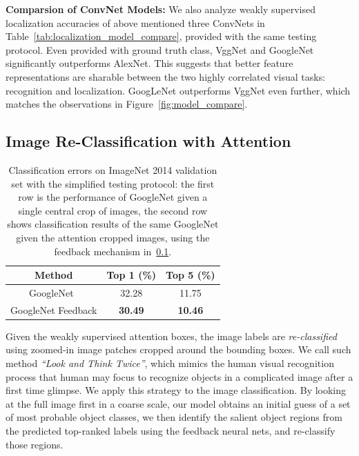 \textbf{Comparsion of ConvNet Models:} We also analyze weakly supervised localization accuracies of above mentioned three ConvNets in Table~\ref{tab:localization_model_compare}, provided with the same testing protocol. Even provided with ground truth class, VggNet and GoogleNet significantly outperforms AlexNet.
This suggests that better feature representations are sharable between the two highly correlated visual tasks: recognition and localization. GoogLeNet outperforms VggNet even further, which matches the observations in Figure~\ref{fig:model_compare}.

\subsection{Image Re-Classification with Attention}
\label{subsec:re-classification}

\begin{table}
\centering
\small
\begin{tabular}{|c|c|c|}
\hline
Method & Top 1 (\%) & Top 5 (\%) \\ \hline
GoogleNet~\cite{Szegedy2014Going} & 32.28 & 11.75 \\ \hline
GoogleNet Feedback & \textbf{30.49} & \textbf{10.46} \\ \hline
\end{tabular}
\caption{Classification errors on ImageNet 2014 validation set with the simplified testing protocol: the first row is the performance of  GoogleNet given a single central crop of images, the second row shows classification results of the same GoogleNet given the attention cropped images, using the feedback mechanism in~\ref{subsec:re-classification}.}
\label{tab:reclassification_error}
\end{table}

Given the weakly supervised attention boxes, the image labels are {\em re-classified} using zoomed-in image patches cropped around the bounding boxes. We call such method {\em ``Look and Think Twice''}, which mimics the human visual recognition process that human may focus to recognize objects in a complicated image after a first time glimpse. We apply this strategy to the image classification. By looking at the full image first in a coarse scale, our model obtains an initial
guess of a set of most probable object classes, we then identify the salient object regions from the predicted top-ranked labels using the feedback neural nets, and re-classify those regions.


